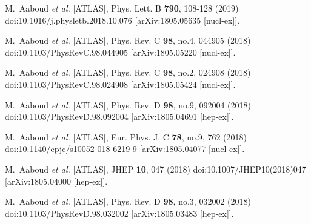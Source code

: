 \begin{thebibliography}{9}
M.~Aaboud \textit{et al.} [ATLAS],
Phys. Lett. B \textbf{790}, 108-128 (2019)
doi:10.1016/j.physletb.2018.10.076
[arXiv:1805.05635 [nucl-ex]].

M.~Aaboud \textit{et al.} [ATLAS],
Phys. Rev. C \textbf{98}, no.4, 044905 (2018)
doi:10.1103/PhysRevC.98.044905
[arXiv:1805.05220 [nucl-ex]].

M.~Aaboud \textit{et al.} [ATLAS],
Phys. Rev. C \textbf{98}, no.2, 024908 (2018)
doi:10.1103/PhysRevC.98.024908
[arXiv:1805.05424 [nucl-ex]].

M.~Aaboud \textit{et al.} [ATLAS],
Phys. Rev. D \textbf{98}, no.9, 092004 (2018)
doi:10.1103/PhysRevD.98.092004
[arXiv:1805.04691 [hep-ex]].

M.~Aaboud \textit{et al.} [ATLAS],
Eur. Phys. J. C \textbf{78}, no.9, 762 (2018)
doi:10.1140/epjc/s10052-018-6219-9
[arXiv:1805.04077 [nucl-ex]].

M.~Aaboud \textit{et al.} [ATLAS],
JHEP \textbf{10}, 047 (2018)
doi:10.1007/JHEP10(2018)047
[arXiv:1805.04000 [hep-ex]].

M.~Aaboud \textit{et al.} [ATLAS],
Phys. Rev. D \textbf{98}, no.3, 032002 (2018)
doi:10.1103/PhysRevD.98.032002
[arXiv:1805.03483 [hep-ex]].


\end{thebibliography}
